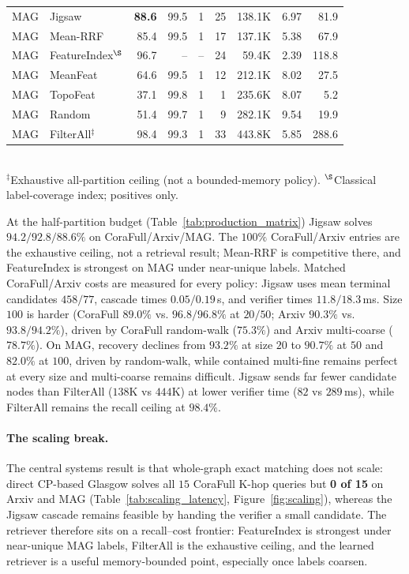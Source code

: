 \documentclass[sigconf, nonacm]{acmart}
\begin{document}
\begin{table}[t]
\begin{tabular}{llrrrrrrr}
\midrule
MAG & Jigsaw & \textbf{88.6} & 99.5 & 1 & 25 & 138.1K & 6.97 & 81.9 \\
MAG & Mean-RRF & 85.4 & 99.5 & 1 & 17 & 137.1K & 5.38 & 67.9 \\
MAG & FeatureIndex$^\S$ & 96.7 & -- & -- & 24 & 59.4K & 2.39 & 118.8 \\
MAG & MeanFeat & 64.6 & 99.5 & 1 & 12 & 212.1K & 8.02 & 27.5 \\
MAG & TopoFeat & 37.1 & 99.8 & 1 & 1 & 235.6K & 8.07 & 5.2 \\
MAG & Random & 51.4 & 99.7 & 1 & 9 & 282.1K & 9.54 & 19.9 \\
MAG & FilterAll$^\ddagger$ & 98.4 & 99.3 & 1 & 33 & 443.8K & 5.85 & 288.6 \\
\bottomrule
\end{tabular}
\\[2pt]
\footnotesize $^\ddagger$Exhaustive all-partition ceiling (not a bounded-memory policy). $^\S$Classical label-coverage index; positives only.
\end{table}

At the half-partition budget (Table~\ref{tab:production_matrix}) Jigsaw solves $94.2/92.8/88.6\%$ on CoraFull/Arxiv/MAG. The $100\%$ CoraFull/Arxiv entries are the exhaustive ceiling, not a retrieval result; Mean-RRF is competitive there, and FeatureIndex is strongest on MAG under near-unique labels. Matched CoraFull/Arxiv costs are measured for every policy: Jigsaw uses mean terminal candidates $458/77$, cascade times $0.05/0.19$\,s, and verifier times $11.8/18.3$\,ms. Size $100$ is harder (CoraFull $89.0\%$ vs. $96.8/96.8\%$ at $20/50$; Arxiv $90.3\%$ vs. $93.8/94.2\%$), driven by CoraFull random-walk ($75.3\%$) and Arxiv multi-coarse ($78.7\%$). On MAG, recovery declines from $93.2\%$ at size $20$ to $90.7\%$ at $50$ and $82.0\%$ at $100$, driven by random-walk, while contained multi-fine remains perfect at every size and multi-coarse remains difficult. Jigsaw sends far fewer candidate nodes than FilterAll ($138$K vs $444$K) at lower verifier time ($82$ vs $289$\,ms), while FilterAll remains the recall ceiling at $98.4\%$.

\paragraph{The scaling break.}
The central systems result is that whole-graph exact matching does not scale: direct CP-based Glasgow solves all $15$ CoraFull K-hop queries but \textbf{0 of 15} on Arxiv and MAG (Table~\ref{tab:scaling_latency}, Figure~\ref{fig:scaling}), whereas the Jigsaw cascade remains feasible by handing the verifier a small candidate. The retriever therefore sits on a recall--cost frontier: FeatureIndex is strongest under near-unique MAG labels, FilterAll is the exhaustive ceiling, and the learned retriever is a useful memory-bounded point, especially once labels coarsen.
\end{document}
